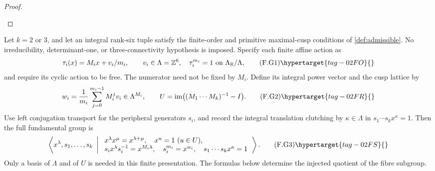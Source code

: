\begin{proof}
\begin{enumerate}[label={$\langle1\rangle$\arabic*.}]
\end{enumerate}
\end{proof}




\begin{theorem}\hypertarget{tag-02NM}{}\label{maps:src:F.2.31}


Let $k=2$ or $3$, and let an integral rank-six tuple satisfy the
finite-order and primitive maximal-cusp conditions of \cref{def:admissible}.  No
irreducibility, determinant-one, or three-connectivity hypothesis is
imposed.  Specify each finite affine action as
\[
 \tau_i(x)=M_ix+v_i/m_i,\qquad v_i\in\Lambda=\mathbb Z^6,
 \quad \tau_i^{m_i}=1\text{ on }\Lambda_{\mathbb R}/\Lambda,
 \tag{F.G1}\hypertarget{tag-02FO}{}\label{maps:eq:F.G1}
\]
and require its cyclic action to be free.  The numerator need not be
fixed by $M_i$.  Define its integral power vector and the cusp
lattice by
\[
 w_i=\frac1{m_i}\sum_{j=0}^{m_i-1}M_i^jv_i\in\Lambda^{M_i},
 \qquad U=\operatorname{im}\bigl((M_1\cdots M_k)^{-1}-I\bigr).
 \tag{F.G2}\hypertarget{tag-02FR}{}\label{maps:eq:F.G2}
\]
Use left conjugation transport for the peripheral generators $s_i$,
and record the integral translation clutching by $\kappa\in\Lambda$
in $s_1\cdots s_kx^\kappa=1$.  Then the full fundamental group is
\[
 \left\langle x^\lambda,s_1,\ldots,s_k\ \left|\
 \begin{array}{l}
 x^\lambda x^\mu=x^{\lambda+\mu},\quad x^u=1\ (u\in U),\\
 s_ix^\lambda s_i^{-1}=x^{M_i\lambda},\quad
 s_i^{m_i}=x^{w_i},\quad s_1\cdots s_kx^\kappa=1
 \end{array}\right.\right\rangle .                         \tag{F.G3}\hypertarget{tag-02FS}{}\label{maps:eq:F.G3}
\]
Only a basis of $\Lambda$ and of $U$ is needed in this finite
presentation. The formulas below determine the injected quotient
of the fibre subgroup.


\end{theorem}
